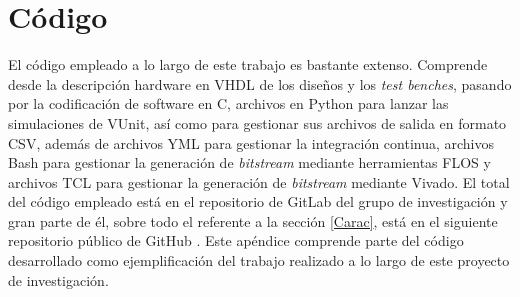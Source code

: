 
\chapter{Código} %

\label{Codigo} %

El código empleado a lo largo de este trabajo es bastante extenso.
Comprende desde la descripción hardware en VHDL de los diseños y los \textit{test benches}, pasando por la codificación de software en C, archivos en Python para lanzar las simulaciones de VUnit, así como para gestionar sus archivos de salida en formato CSV, además de archivos YML para gestionar la integración continua, archivos Bash para gestionar la generación de \textit{bitstream} mediante herramientas FLOS y archivos TCL para gestionar la generación de \textit{bitstream} mediante Vivado. 
El total del código empleado está en el repositorio de GitLab del grupo de investigación y gran parte de él, sobre todo el referente a la sección \ref{Carac}, está en el siguiente repositorio público de GitHub \cite{gh:practices}.
Este apéndice comprende parte del código desarrollado como ejemplificación del trabajo realizado a lo largo de este proyecto de investigación.



